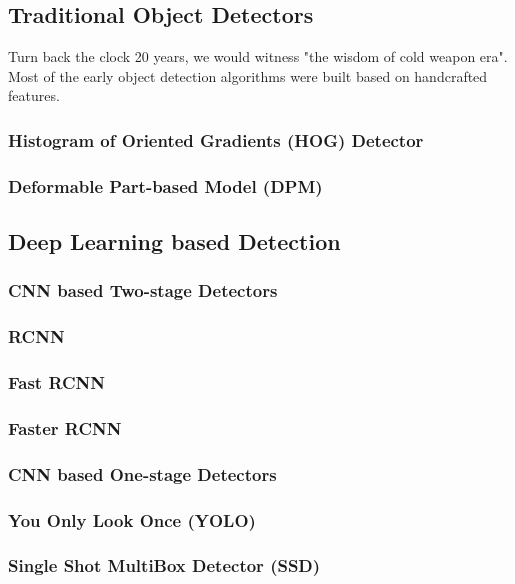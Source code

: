 \documentclass[12pt]{article}
\begin{document}
\subsection{Traditional Object Detectors}
\label{sec:tradional}
Turn back the clock 20 years, we would witness "the wisdom of cold weapon era". Most 
of the early object detection algorithms were built based on handcrafted features. 

\subsubsection{Histogram of Oriented Gradients (HOG) Detector}
\label{sec:hog}

\subsubsection{Deformable Part-based Model (DPM)}
\label{sec:dpm}

\subsection{Deep Learning based Detection}
\label{sec:deep_learning}

\subsubsection{CNN based Two-stage Detectors}
\label{sec:two_stage}

\subsubsection*{RCNN}
\subsubsection*{Fast RCNN}
\subsubsection*{Faster RCNN}

\subsubsection{CNN based One-stage Detectors}
\label{sec:one_stage}

\subsubsection*{You Only Look Once (YOLO)}
\subsubsection*{Single Shot MultiBox Detector (SSD)}
\end{document}
